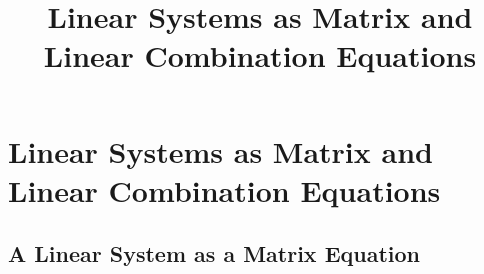 \documentclass{ximera}
\title{Linear Systems as Matrix and Linear Combination Equations} \license{CC BY-NC-SA 4.0}
\begin{document}
\begin{abstract}
  
\end{abstract}
\maketitle

\section*{Linear Systems as Matrix and Linear Combination Equations}

\subsection*{A Linear System as a Matrix Equation}
\end{document}
